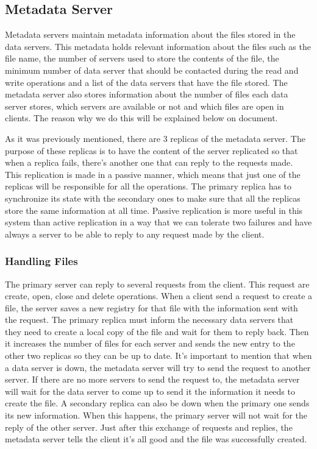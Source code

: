 \subsection{Metadata Server}

Metadata servers maintain metadata information about the files stored
in the data servers. This metadata holds relevant information about
the files such as the file name, the number of servers used to store
the contents of the file, the minimum number of data server that should
be contacted during the read and write operations and a list of the
data servers that have the file stored. The metadata server also stores
information about the number of files each data server stores, which
servers are available or not and which files are open in clients.
The reason why we do this will be explained below on document.

As it was previously mentioned, there are 3 replicas of the metadata
server. The purpose of these replicas is to have the content of the
server replicated so that when a replica fails, there's another one
that can reply to the requests made. This replication is made in a
passive manner, which means that just one of the replicas will be
responsible for all the operations. The primary replica has to
synchronize its state with the secondary ones to make sure that all
the replicas store the same information at all time. Passive replication
is more useful in this system than active replication in a way that we
can tolerate two failures and have always a server to be able to reply to
any request made by the client.

\subsubsection{Handling Files}

The primary server can reply to several requests from the client. This
request are create, open, close and delete operations.
When a client send a request to create a file, the server saves a new
registry for that file with the information sent with the request. The
primary replica must inform the necessary data servers that they need to
create a local copy of the file and wait for them to reply back. Then
it increases the number of files for each server and sends the new 
entry to the other two replicas so they can be up to date. It's important 
to mention that when a data server is down, the metadata server will try 
to send the request to another server. If there are no more servers to 
send the request to, the metadata server will wait for the data server 
to come up to send it the information it needs to create the file. A 
secondary replica can also be down when the primary one sends its new 
information. When this happens, the primary server will not wait for 
the reply of the other server. Just after this exchange of requests and
replies, the metadata server tells the client it's all good and the file 
was successfully created.

